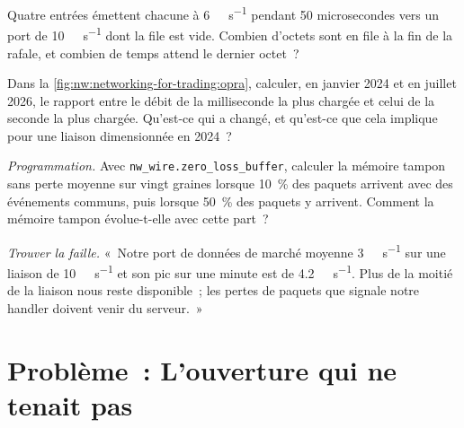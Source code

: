 \begin{exercise}[$\star\star$]\label{exo:nw:networking-for-trading:5}
Quatre entrées émettent chacune à \qty{6}{\giga\bit\per\second} pendant 50 microsecondes vers un port de \qty{10}{\giga\bit\per\second} dont la
file est vide. Combien d'octets sont en file à la fin de la rafale, et combien de temps attend le dernier octet~?
\end{exercise}

\begin{exercise}[$\star\star$]\label{exo:nw:networking-for-trading:6}
Dans la \cref{fig:nw:networking-for-trading:opra}, calculer, en janvier 2024 et en juillet 2026, le rapport entre le débit de la milliseconde la plus
chargée et celui de la seconde la plus chargée. Qu'est-ce qui a changé, et qu'est-ce que cela implique pour une liaison dimensionnée en 2024~?
\end{exercise}

\begin{exercise}[$\star\star\star$]\label{exo:nw:networking-for-trading:7}
\emph{Programmation.} Avec \texttt{nw\_wire.zero\_loss\_buffer}, calculer la mémoire tampon sans perte moyenne sur vingt graines lorsque 10~\% des paquets
arrivent avec des événements communs, puis lorsque 50~\% des paquets y arrivent. Comment la mémoire tampon évolue-t-elle avec cette part~?
\end{exercise}

\begin{exercise}[$\star\star\star$]\label{exo:nw:networking-for-trading:8}
\emph{Trouver la faille.} «~Notre port de données de marché moyenne \qty{3}{\giga\bit\per\second} sur une liaison de \qty{10}{\giga\bit\per\second} et
son pic sur une minute est de \qty{4.2}{\giga\bit\per\second}. Plus de la moitié de la liaison nous reste disponible~; les pertes de paquets que signale notre handler
doivent venir du serveur.~»
\end{exercise}

\section{Problème~: L'ouverture qui ne tenait pas}

